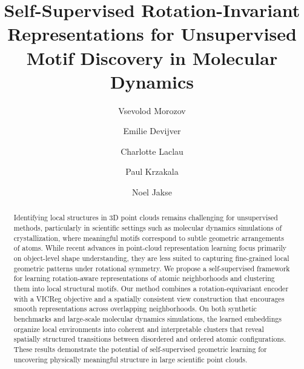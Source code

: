 \documentclass[runningheads]{llncs}
\begin{document}
\title{Self-Supervised Rotation-Invariant Representations for Unsupervised Motif Discovery in Molecular Dynamics}


\author{Vsevolod Morozov \and
Emilie Devijver \and
Charlotte Laclau \and
Paul Krzakala \and
Noel Jakse}



\maketitle

\begin{abstract}
Identifying local structures in 3D point clouds remains challenging for unsupervised methods, particularly in scientific settings such as molecular dynamics simulations of crystallization, where meaningful motifs correspond to subtle geometric arrangements of atoms. While recent advances in point-cloud representation learning focus primarily on object-level shape understanding, they are less suited to capturing fine-grained local geometric patterns under rotational symmetry.
  We propose a self-supervised framework for learning rotation-aware representations of atomic neighborhoods and clustering them into local structural motifs. Our method combines a rotation-equivariant encoder with a VICReg objective and a spatially consistent view construction that encourages smooth representations across overlapping neighborhoods. On both synthetic benchmarks and large-scale molecular dynamics simulations, the learned embeddings organize local environments into coherent and interpretable clusters that reveal spatially structured transitions between disordered and ordered atomic configurations. These results demonstrate the potential of self-supervised geometric learning for uncovering physically meaningful structure in large scientific point clouds.
\end{abstract}
\end{document}
